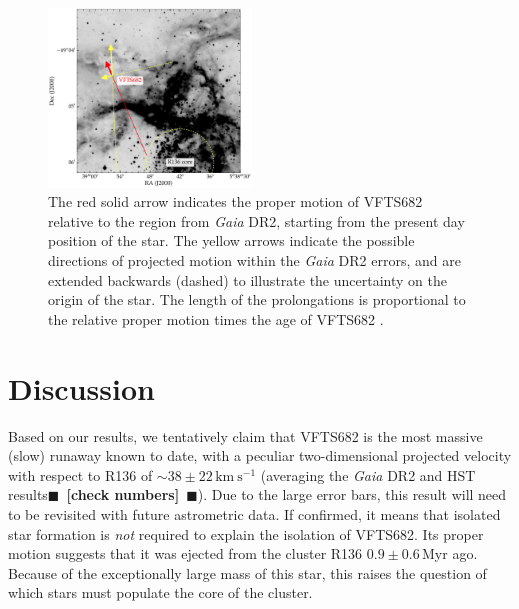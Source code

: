 \documentclass[apjl,twocolumn]{emulateapj}
\newcommand{\todo}[1]{{\large $\blacksquare$~\textbf{\color{red}[#1]}}~$\blacksquare$}
\newcommand{\SdM}[1]{{{\color{brown}{#1}}}}
\newcommand{\kms}{{\,\mathrm{km\ s^{-1}}}}
\begin{document}
\begin{figure}%
  \centering
  \includegraphics[width=0.48\textwidth]{./figures/main_plot_good_gaia_only}  
  \caption{\SdM{I don't see a reason why we would not show the HST data, except for wanting to hide it maybe.  Let's sit together and find a good way to plot both.  (Hope you still have the script to show the HST direction. )}  The red solid arrow indicates the proper motion of VFTS682 
    relative to the region from \emph{Gaia} DR2, starting from the present day position of
    the star. The yellow arrows indicate the possible
    directions of projected motion within the \emph{Gaia} DR2 errors, and are extended
    backwards (dashed) to illustrate the uncertainty on the origin of the
    star. The length of the prolongations is proportional to the relative proper motion
    times the age of VFTS682 \citep[$1.0\pm0.2$\,Myr,][]{schneider:18}.
  }
  
  \label{fig:main}
\end{figure}


\section{Discussion}
\label{sec:discussion}

Based on our results, we tentatively claim that VFTS682 is the most massive
(slow) runaway known to date, with a peculiar two-dimensional
projected velocity with respect to R136 of
$\sim38\pm22\kms$ (averaging the \emph{Gaia} DR2 and HST
results\todo{check numbers}). Due to the large error bars, this result will need
to be revisited with future astrometric data. %
If confirmed, it means that isolated star formation is
\emph{not} required to explain the isolation of VFTS682. Its proper motion suggests that it was ejected from the cluster R136
$0.9\pm0.6$\,Myr ago. Because of the exceptionally large mass
of this star, this raises the question of which stars must populate
the core of the cluster.
\end{document}
